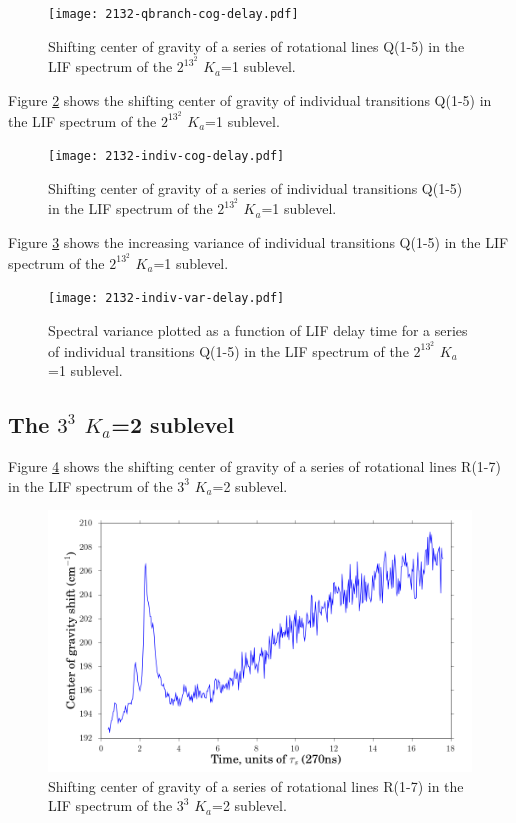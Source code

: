 \documentclass[12pt]{mitthesis}
\begin{document}
\begin{figure}
  \caption{Shifting center of gravity of a series of rotational lines
    Q(1-5) in the LIF spectrum of the $2^13^2$ $K_a$=1 sublevel.}
  \label{fig:2132-qbranch-cog-delay}
  \centering
  \texttt{[image: 2132-qbranch-cog-delay.pdf]}
\end{figure}

Figure \ref{fig:2132-indiv-cog-delay} shows the shifting center of
gravity of individual transitions Q(1-5) in the LIF spectrum of
the $2^13^2$ $K_a$=1 sublevel.

\begin{figure}
  \caption{Shifting center of gravity of a series of individual
    transitions Q(1-5) in the LIF spectrum of the $2^13^2$ $K_a$=1
    sublevel.}
  \label{fig:2132-indiv-cog-delay}
  \centering
  \texttt{[image: 2132-indiv-cog-delay.pdf]}
\end{figure}

Figure \ref{fig:2132-indiv-var-delay} shows the increasing variance of
individual transitions Q(1-5) in the LIF spectrum of the $2^13^2$
$K_a$=1 sublevel.

\begin{figure}
  \caption{Spectral variance plotted as a function of LIF delay time
    for a series of individual transitions Q(1-5) in the LIF spectrum
    of the $2^13^2$ $K_a$=1 sublevel.}
  \label{fig:2132-indiv-var-delay}
  \centering
  \texttt{[image: 2132-indiv-var-delay.pdf]}
\end{figure}

\subsection{The $3^3$ $K_a$=2 sublevel}

Figure \ref{fig:33k2-cog-delay} shows the shifting center of gravity
of a series of rotational lines R(1-7) in the LIF spectrum of the
$3^3$ $K_a$=2 sublevel.

\begin{figure}
  \caption{Shifting center of gravity of a series of rotational lines
    R(1-7) in the LIF spectrum of the $3^3$ $K_a$=2 sublevel.}
  \label{fig:33k2-cog-delay}
  \centering
  \includegraphics[width=6in]{33k2-cog-delay.png}
\end{figure}
\end{document}

